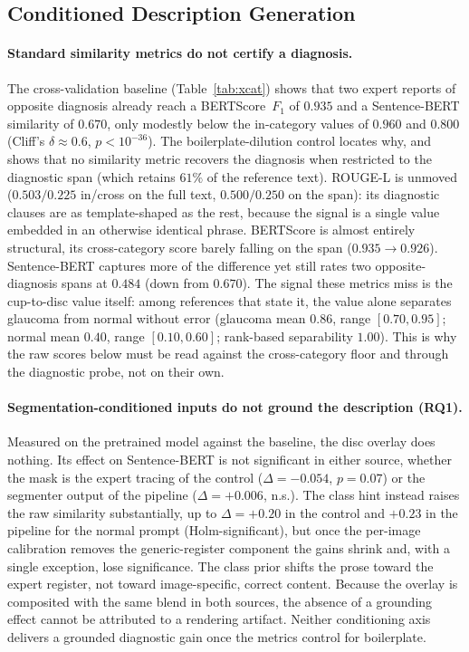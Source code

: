 \documentclass[runningheads]{llncs}
\begin{document}
\subsection{Conditioned Description Generation}
\label{sec:results-conditioning}

\paragraph{Standard similarity metrics do not certify a diagnosis.}
The cross-validation baseline (Table~\ref{tab:xcat}) shows that two expert reports of opposite diagnosis already reach a BERTScore~$F_1$ of $0.935$ and a Sentence-BERT similarity of $0.670$, only modestly below the in-category values of $0.960$ and $0.800$ (Cliff's $\delta\approx0.6$, $p<10^{-36}$). The boilerplate-dilution control locates why, and shows that no similarity metric recovers the diagnosis when restricted to the diagnostic span (which retains $61\%$ of the reference text). ROUGE-L is unmoved ($0.503/0.225$ in/cross on the full text, $0.500/0.250$ on the span): its diagnostic clauses are as template-shaped as the rest, because the signal is a single value embedded in an otherwise identical phrase. BERTScore is almost entirely structural, its cross-category score barely falling on the span ($0.935\to0.926$). Sentence-BERT captures more of the difference yet still rates two opposite-diagnosis spans at $0.484$ (down from $0.670$). The signal these metrics miss is the cup-to-disc value itself: among references that state it, the value alone separates glaucoma from normal without error (glaucoma mean $0.86$, range $[0.70,0.95]$; normal mean $0.40$, range $[0.10,0.60]$; rank-based separability $1.00$). This is why the raw scores below must be read against the cross-category floor and through the diagnostic probe, not on their own.

\paragraph{Segmentation-conditioned inputs do not ground the description (RQ1).}
Measured on the pretrained model against the baseline, the disc overlay does nothing. Its effect on Sentence-BERT is not significant in either source, whether the mask is the expert tracing of the control ($\Delta=-0.054$, $p=0.07$) or the segmenter output of the pipeline ($\Delta=+0.006$, n.s.). The class hint instead raises the raw similarity substantially, up to $\Delta=+0.20$ in the control and $+0.23$ in the pipeline for the normal prompt (Holm-significant), but once the per-image calibration removes the generic-register component the gains shrink and, with a single exception, lose significance. The class prior shifts the prose toward the expert register, not toward image-specific, correct content. Because the overlay is composited with the same blend in both sources, the absence of a grounding effect cannot be attributed to a rendering artifact. Neither conditioning axis delivers a grounded diagnostic gain once the metrics control for boilerplate.
\end{document}
